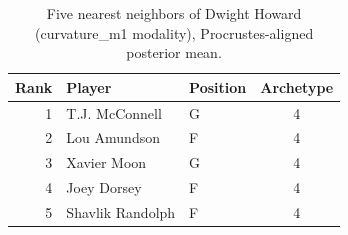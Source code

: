 \begin{table}[htbp]
  \centering\small
  \begin{tabular}{rllc}
    \toprule
    Rank & Player & Position & Archetype \\
    \midrule
    1 & T.J. McConnell & G & 4 \\
    2 & Lou Amundson & F & 4 \\
    3 & Xavier Moon & G & 4 \\
    4 & Joey Dorsey & F & 4 \\
    5 & Shavlik Randolph & F & 4 \\
    \bottomrule
  \end{tabular}
  \caption{Five nearest neighbors of Dwight Howard (curvature_m1 modality), Procrustes-aligned posterior mean.}
  \label{tab:Dwight_Howard_neighbors_curvature_m1}
\end{table}

